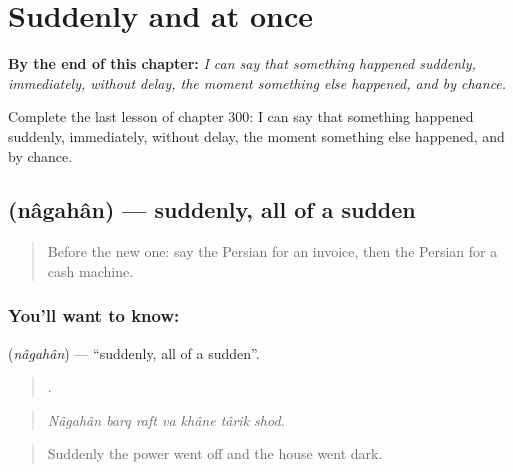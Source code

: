 
\chapter{Suddenly and at once}
\label{ch:fa-suddenly-and-at-once}

\begin{chapteropening}
\textbf{By the end of this chapter:} \emph{I can say that something happened suddenly, immediately, without delay, the moment something else happened, and by chance.}

Complete the last lesson of chapter 300: I can say that something happened suddenly, immediately, without delay, the moment something else happened, and by chance.
\end{chapteropening}

\section[\texorpdfstring{\fa{ناگهان} (nâgahân)}{ناگهان (nâgahân)}]{ (nâgahân) — suddenly, all of a sudden}

\label{lesson:FA-C300-nagahan}



\begin{quote}
Before the new one: say the Persian for an invoice, then the Persian for a cash machine.
\end{quote}

\subsection*{You'll want to know: }
\textbf{} (\emph{nâgahân}) — \textquotedblleft{}suddenly, all of a sudden\textquotedblright{}.

\begin{quote}
      .
\end{quote}

\begin{quote}
\emph{Nâgahân barq raft va khâne târik shod.}
\end{quote}

\begin{quote}
Suddenly the power went off and the house went dark.
\end{quote}

